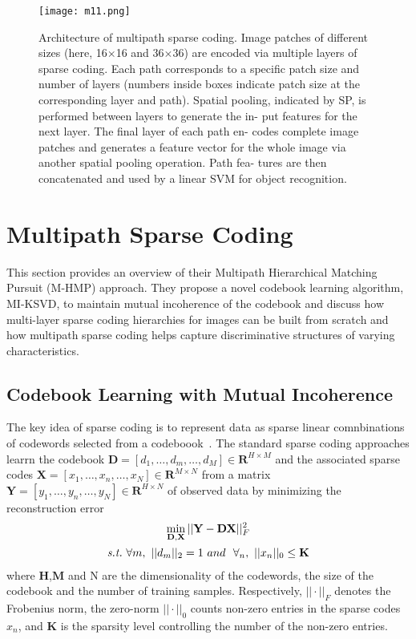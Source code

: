 \documentclass[10pt,twocolumn,letterpaper]{article}
\begin{document}
\begin{figure}
\begin{center}
\texttt{[image: m11.png]}
\end{center}
\caption{Architecture of multipath sparse coding. Image patches of different sizes (here, 16$\times$16 and 36$\times$36) are encoded via multiple layers of sparse coding. Each path corresponds to a specific patch size and number of layers (numbers inside boxes indicate patch size at the corresponding layer and path). Spatial pooling, indicated by SP, is performed between layers to generate the in- put features for the next layer. The final layer of each path en- codes complete image patches and generates a feature vector for the whole image via another spatial pooling operation. Path fea- tures are then concatenated and used by a linear SVM for object recognition.}
\label{fig1}
\end{figure}

\section{Multipath Sparse Coding}

This section provides an overview of their Multipath Hierarchical Matching Pursuit (M-HMP) approach. They propose a novel codebook learning algorithm, MI-KSVD, to maintain mutual incoherence of the codebook and discuss how multi-layer sparse coding hierarchies for images can be built from scratch and how multipath sparse coding helps capture discriminative structures of varying characteristics.

\subsection{Codebook Learning with Mutual Incoherence}

The key idea of sparse coding is to represent data as sparse linear comnbinations of codewords selected from a codeboook~\cite{Emergence}. The standard sparse coding approaches learrn the codebook $\mathbf{D} = [d_1,\dots,d_m,\dots,d_M] \in \mathbf{R}^{H\times M}$ and the associated sparse codes $\mathbf{X} = [x_1,\dots,x_n,\dots,x_N] \in \mathbf{R}^{M\times N}$ from a matrix $\mathbf{Y} = [y_1,\dots,y_n,\dots,y_N] \in \mathbf{R}^{H\times N}$ of observed data by minimizing the reconstruction error~\cite{multipath}\\
\begin{gather}
\mathop{\min}\limits_{\mathbf{D},\mathbf{X}}||\mathbf{Y} - \mathbf{DX}||_F^2\\
\text{\emph{s.t.}}~\forall m,~||d_m||_2 = 1~and~~\forall_n,~||x_n||_0 \le \mathbf{K} \notag
\end{gather}
\balance
where $\mathbf{H}$,$\mathbf{M}$ and N are the dimensionality of the codewords, the size of the codebook and the number of training samples. Respectively, $||\cdot||_F$ denotes the Frobenius norm, the zero-norm $||\cdot||_0$ counts non-zero entries in the sparse codes $x_n$, and $\mathbf{K}$ is the sparsity level controlling the number of the non-zero entries. 
\end{document}
